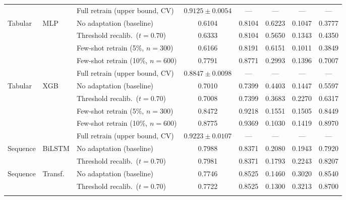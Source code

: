 \begin{table}[htbp]
{\begin{tabular}{lllccccc}
 &  & Full retrain (upper bound, CV) & $0.9125 \pm 0.0054$ & — & — & — & — \\
\addlinespace[1.5pt]
Tabular & MLP & No adaptation (baseline) & 0.6104 & 0.8104 & 0.6223 & 0.1047 & 0.3777 \\
 &  & Threshold recalib.~($t=0.70$) & 0.6333 & 0.8104 & 0.5650 & 0.1343 & 0.4350 \\
 &  & Few-shot retrain (5\%, $n=300$) & 0.6166 & 0.8191 & 0.6151 & 0.1011 & 0.3849 \\
 &  & Few-shot retrain (10\%, $n=600$) & 0.7791 & 0.8771 & 0.2993 & 0.1396 & 0.7007 \\
 &  & Full retrain (upper bound, CV) & $0.8847 \pm 0.0098$ & — & — & — & — \\
\addlinespace[1.5pt]
Tabular & XGB & No adaptation (baseline) & 0.7010 & 0.7399 & 0.4403 & 0.1447 & 0.5597 \\
 &  & Threshold recalib.~($t=0.70$) & 0.7008 & 0.7399 & 0.3683 & 0.2270 & 0.6317 \\
 &  & Few-shot retrain (5\%, $n=300$) & 0.8472 & 0.9218 & 0.1551 & 0.1505 & 0.8449 \\
 &  & Few-shot retrain (10\%, $n=600$) & 0.8775 & 0.9369 & 0.1030 & 0.1419 & 0.8970 \\
 &  & Full retrain (upper bound, CV) & $0.9223 \pm 0.0107$ & — & — & — & — \\
\addlinespace[1.5pt]
\midrule
Sequence & BiLSTM & No adaptation (baseline) & 0.7988 & 0.8371 & 0.2080 & 0.1943 & 0.7920 \\
 &  & Threshold recalib.~($t=0.70$) & 0.7981 & 0.8371 & 0.1793 & 0.2243 & 0.8207 \\
\addlinespace[1.5pt]
Sequence & Transf. & No adaptation (baseline) & 0.7746 & 0.8525 & 0.1460 & 0.3020 & 0.8540 \\
 &  & Threshold recalib.~($t=0.70$) & 0.7722 & 0.8525 & 0.1300 & 0.3213 & 0.8700 \\
\addlinespace[1.5pt]
\bottomrule
\end{tabular}}
\end{table}
